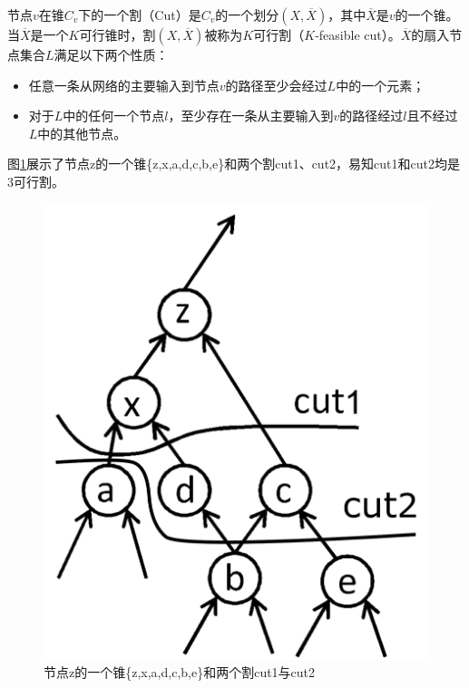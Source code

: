 节点$v$在锥$C_v$下的一个割（Cut）是$C_v$的一个划分$(X,\overline{X})$，其中$\overline{X}$是$v$的一个锥。当$\overline{X}$是一个$K$可行锥时，割$(X,\overline{X})$被称为$K$可行割（$K$-feasible cut）\cite{FPGA:Jason_Cong_1999_cut_ranking}。$\overline{X}$的扇入节点集合$L$满足以下两个性质：
\begin{itemize}
    \item 任意一条从网络的主要输入到节点$v$的路径至少会经过$L$中的一个元素；
    \item 对于$L$中的任何一个节点$l$，至少存在一条从主要输入到$v$的路径经过$l$且不经过$L$中的其他节点。
\end{itemize}
图\ref{LS:z_cone_two_cuts}展示了节点z的一个锥\{z,x,a,d,c,b,e\}和两个割\cite{FPGA:CLB_Anderson}cut1、cut2，易知cut1和cut2均是3可行割。
\begin{figure}[!htbp]
    \centering
    \includegraphics[width=0.4\linewidth]{./figs/LS-z_cone_two_cuts.pdf}
    \caption{节点z的一个锥\{z,x,a,d,c,b,e\}和两个割cut1与cut2}
    \label{LS:z_cone_two_cuts}
\end{figure}

